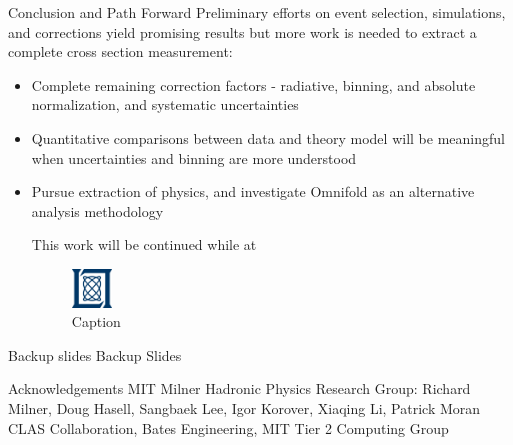 \documentclass[aspectratio=169]{beamer}
\begin{document}
\begin{frame}{Conclusion and Path Forward}
Preliminary efforts on event selection, simulations, and corrections yield promising results but more work is needed to extract a complete cross section measurement:
\vspace{0.4cm}
\begin{itemize}
    \setlength\itemsep{1em}
    \item Complete remaining correction factors - radiative, binning, and absolute normalization, and systematic uncertainties
    \item Quantitative comparisons between data and theory model will be meaningful when uncertainties and binning are more understood
    \item Pursue extraction of physics, and investigate Omnifold as an alternative analysis methodology

This work will be continued while at 
\begin{figure}
    \centering
    \includegraphics[width=0.1\textwidth]{defense/lincolnlabslogo.png}
    \caption{Caption}
    \label{fig:enter-label}
\end{figure}
\end{itemize}

\end{frame}
    




\appendix



\begin{frame}{Backup slides}
Backup Slides

\end{frame}


\begin{frame}{Acknowledgements}
MIT Milner Hadronic Physics Research Group: Richard Milner, Doug Hasell, Sangbaek Lee, Igor Korover, Xiaqing Li, Patrick Moran\\
CLAS Collaboration, Bates Engineering, MIT Tier 2 Computing Group
    
\end{frame}
\end{document}
